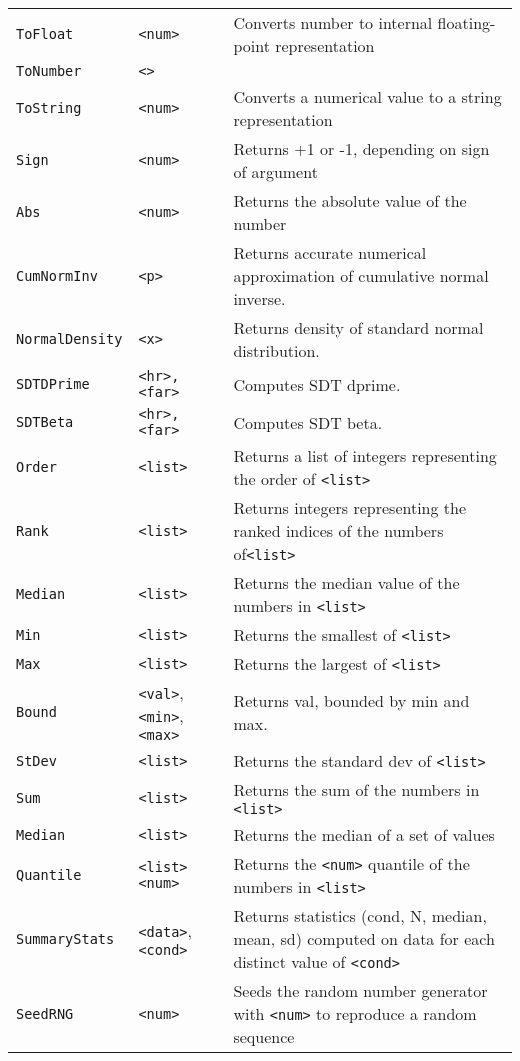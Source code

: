\begin{longtable}{p{3cm}p{3cm}p{6cm}}
\verb+ToFloat+ &\verb+<num>+ &Converts number to internal floating-point representation\\ 
\verb+ToNumber+ &\verb+<>+ & \\ 
\verb+ToString+ &\verb+<num>+ &Converts a numerical value to a string representation\\ 
\verb+Sign+ &\verb+<num>+ &Returns +1 or -1, depending on sign of argument\\ 
\verb+Abs+ &\verb+<num>+ &Returns the absolute value of the number\\ 
\verb+CumNormInv+&\verb+<p>+&Returns accurate numerical approximation of cumulative normal inverse.\\
\verb+NormalDensity+&\verb+<x>+&Returns density of standard normal distribution.\\
\verb+SDTDPrime+&\verb+<hr>,<far>+&Computes SDT dprime.\\
\verb+SDTBeta+&\verb+<hr>,<far>+&Computes SDT beta.\\
\verb+Order+ &\verb+<list>+ &Returns a list of integers representing the order of \verb+<list>+\\ 
\verb+Rank+ &\verb+<list>+ &Returns integers representing the ranked indices of the numbers of\verb+<list>+\\ 
\verb+Median+ &\verb+<list>+ &Returns the median value of the numbers in \verb+<list>+\\ 
\verb+Min+ &\verb+<list>+ &Returns the smallest of \verb+<list>+\\ 
\verb+Max+ &\verb+<list>+ &Returns the largest of \verb+<list>+\\ 
\verb+Bound+&\verb+<val>+, \verb+<min>+, \verb+<max>+& Returns val, bounded by min and max.\\
\verb+StDev+ &\verb+<list>+ &Returns the standard dev of \verb+<list>+ \\ 
\verb+Sum+ &\verb+<list>+ &Returns the sum of the numbers in \verb+<list>+\\ 
\verb+Median+ &\verb+<list>+ &Returns the median of a set of values \\ 
\verb+Quantile+ &\verb+<list> <num>+ &Returns the \verb+<num>+ quantile of the numbers in \verb+<list>+\\ 
\verb+SummaryStats+ &\verb+<data>+,\verb+<cond>+ &Returns statistics (cond, N, median, mean, sd) computed on data for each distinct value of \verb+<cond>+\\ 
\verb+SeedRNG+ &\verb+<num>+ &Seeds the random number generator with \verb+<num>+ to reproduce a random sequence\\ 

\end{longtable}
